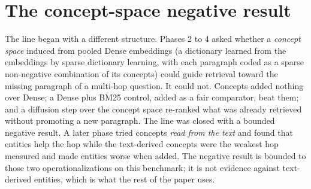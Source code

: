 \section{The concept-space negative result}
\label{sec:concepts}

The line began with a different structure. Phases 2 to 4 asked whether a \emph{concept space}
induced from pooled Dense embeddings (a dictionary learned from the embeddings by sparse dictionary learning, with
each paragraph coded as a sparse non-negative combination of its concepts) could guide retrieval toward the missing paragraph of a multi-hop question. It could
not. Concepts added nothing over Dense; a Dense plus BM25 control, added as a fair comparator,
beat them; and a diffusion step over the concept space re-ranked what was already retrieved
without promoting a new paragraph. The line was closed with a bounded negative result.
A later phase tried concepts \emph{read from the text} and found that entities help the hop
while the text-derived concepts were the weakest hop measured and made entities worse when added.
The negative result is bounded to those two operationalizations on this benchmark; it is not
evidence against text-derived entities, which is what the rest of the paper uses.
